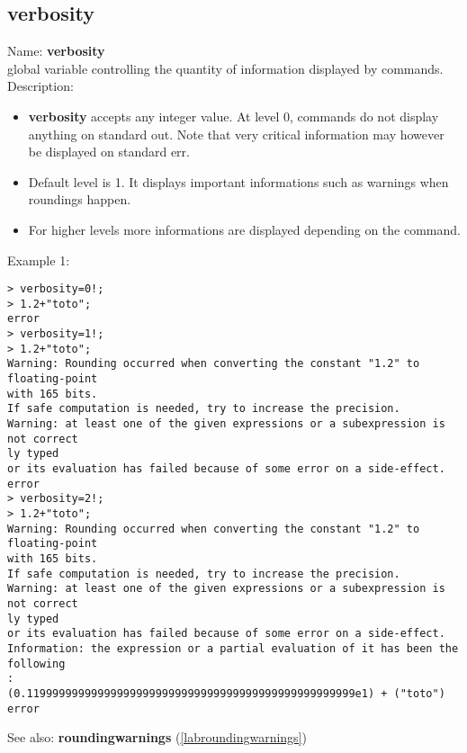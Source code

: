 \subsection{verbosity}
\label{labverbosity}
\noindent Name: \textbf{verbosity}\\
global variable controlling the quantity of information displayed by commands.\\

\noindent Description: \begin{itemize}

\item \textbf{verbosity} accepts any integer value. At level 0, commands do not display anything
   on standard out. Note that very critical information may however be displayed on
   standard err.

\item Default level is 1. It displays important informations such as warnings when 
   roundings happen.

\item For higher levels more informations are displayed depending on the command.
\end{itemize}
\noindent Example 1: 
\begin{center}\begin{minipage}{15cm}\begin{Verbatim}[frame=single]
> verbosity=0!;
> 1.2+"toto";
error
> verbosity=1!;
> 1.2+"toto";
Warning: Rounding occurred when converting the constant "1.2" to floating-point 
with 165 bits.
If safe computation is needed, try to increase the precision.
Warning: at least one of the given expressions or a subexpression is not correct
ly typed
or its evaluation has failed because of some error on a side-effect.
error
> verbosity=2!;
> 1.2+"toto";
Warning: Rounding occurred when converting the constant "1.2" to floating-point 
with 165 bits.
If safe computation is needed, try to increase the precision.
Warning: at least one of the given expressions or a subexpression is not correct
ly typed
or its evaluation has failed because of some error on a side-effect.
Information: the expression or a partial evaluation of it has been the following
:
(0.119999999999999999999999999999999999999999999999999e1) + ("toto")
error
\end{Verbatim}
\end{minipage}\end{center}
See also: \textbf{roundingwarnings} (\ref{labroundingwarnings})
